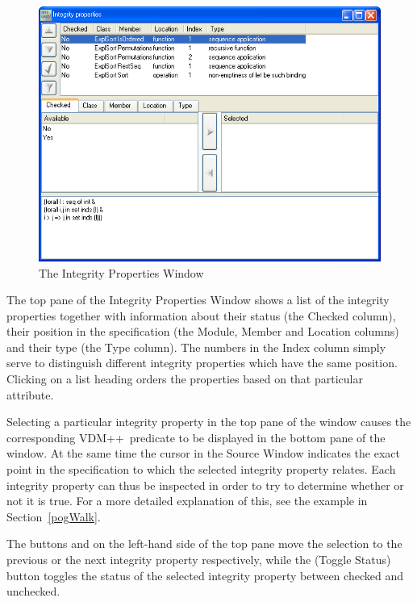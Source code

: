 \documentclass[\pformat,12pt]{article}
\newcommand{\vdmslpp}{VDM++}
\newcommand{\guicmd}[1]{{\sf #1}}
\begin{document}
\begin{figure}[tbh]
\begin{center}
\includegraphics[width=12.5cm]{integWin-ppENG.png}
\caption{The Integrity Properties Window}
\label{fig:integWin2}
\end{center}
\end{figure}

The top pane of the \guicmd{Integrity Properties Window} shows a list
of the integrity properties together with information about their
status (the \guicmd{Checked} column), their position in the
specification (the \guicmd{Module}, \guicmd{Member} and
\guicmd{Location} columns) and 
their type (the \guicmd{Type} column). The numbers in the
\guicmd{Index} column simply serve to distinguish different integrity
properties which have the same position. Clicking on a list heading
orders the properties based on that particular attribute.

Selecting a particular integrity property in the top pane of the
window causes the corresponding \vdmslpp\ predicate to be displayed in
the bottom pane of the window. At the same time the cursor in the
\guicmd{Source Window} indicates the exact point in the specification to
which the selected integrity property relates. Each integrity property
can thus be inspected in order to try to determine whether or not it
is true. For a more detailed explanation of this, see the example in
Section~\ref{pogWalk}.

The buttons 
 and
 on the
left-hand side of the top pane move the selection to the previous or
the next integrity property respectively, while the 
(\guicmd{Toggle Status}) button toggles the status of the selected
integrity property between checked and unchecked.
\end{document}

